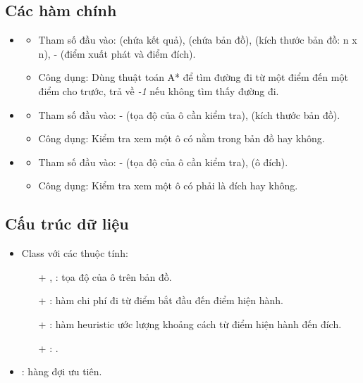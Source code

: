 \subsection{Các hàm chính}
\begin{itemize}
	\item {}
	\begin{itemize}
		\item Tham số đầu vào:  (chứa kết quả),  (chứa bản đồ),  (kích thước bản đồ: n x n),  -  (điểm xuất phát và điểm đích).
		\item Công dụng: Dùng thuật toán A* để tìm đường đi từ một điểm đến một điểm cho trước, trả về \textit{-1} nếu không tìm thấy đường đi.
	\end{itemize}
	
	\item {}
	\begin{itemize}
		\item Tham số đầu vào:  -  (tọa độ của ô cần kiểm tra),  (kích thước bản đồ).
		\item Công dụng: Kiểm tra xem một ô có nằm trong bản đồ hay không.
	\end{itemize}
	
	\item {}
	\begin{itemize}
		\item Tham số đầu vào:  -  (tọa độ của ô cần kiểm tra),  (ô đích).
		\item Công dụng: Kiểm tra xem một ô có phải là đích hay không.
	\end{itemize}
\end{itemize}

\subsection{Cấu trúc dữ liệu}
\begin{itemize}
	\item Class  với các thuộc tính:
	\begin{itemize}
		\item[+] , : tọa độ của ô trên bản đồ.
		\item[+] : hàm chi phí đi từ điểm bắt đầu đến điểm hiện hành.
		\item[+] : hàm heuristic ước lượng khoảng cách từ điểm hiện hành đến đích.
		\item[+] : .
	\end{itemize}
	\item {}: hàng đợi ưu tiên.
\end{itemize}

